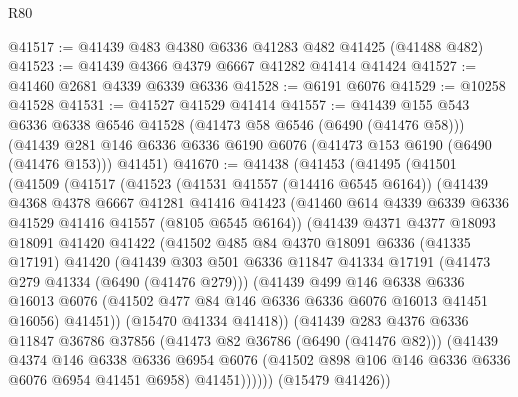\begin{lexlean}{R80}
\begin{coremodule}
@41517 := @41439 @483 @4380 @6336 @41283 @482 @41425 (@41488 @482)
@41523 := @41439 @4366 @4379 @6667 @41282 @41414 @41424
@41527 := @41460 @2681 @4339 @6339 @6336
@41528 := @6191 @6076
@41529 := @10258 @41528
@41531 := @41527 @41529 @41414
@41557 := @41439
    @155
    @543
    @6336
    @6338
    @6546
    @41528
    (@41473 @58 @6546 (@6490 (@41476 @58)))
    (@41439 @281 @146 @6336 @6336 @6190 @6076 (@41473 @153 @6190 (@6490 (@41476 @153))) @41451)
@41670 := @41438
    (@41453
      (@41495
        (@41501
          (@41509
            (@41517
              (@41523
                (@41531 @41557 (@14416 @6545 @6164))
                (@41439
                  @4368
                  @4378
                  @6667
                  @41281
                  @41416
                  @41423
                  (@41460 @614 @4339 @6339 @6336 @41529 @41416 @41557 (@8105 @6545 @6164))
                  (@41439
                    @4371
                    @4377
                    @18093
                    @18091
                    @41420
                    @41422
                    (@41502
                      @485
                      @84
                      @4370
                      @18091
                      @6336
                      (@41335 @17191)
                      @41420
                      (@41439
                        @303
                        @501
                        @6336
                        @11847
                        @41334
                        @17191
                        (@41473 @279 @41334 (@6490 (@41476 @279)))
                        (@41439
                          @499
                          @146
                          @6338
                          @6336
                          @16013
                          @6076
                          (@41502 @477 @84 @146 @6336 @6336 @6076 @16013 @41451 @16056)
                          @41451))
                      (@15470 @41334 @41418))
                    (@41439
                      @283
                      @4376
                      @6336
                      @11847
                      @36786
                      @37856
                      (@41473 @82 @36786 (@6490 (@41476 @82)))
                      (@41439
                        @4374
                        @146
                        @6338
                        @6336
                        @6954
                        @6076
                        (@41502 @898 @106 @146 @6336 @6336 @6076 @6954 @41451 @6958)
                        @41451))))))
            (@15479 @41426))

\end{coremodule}
\end{lexlean}
